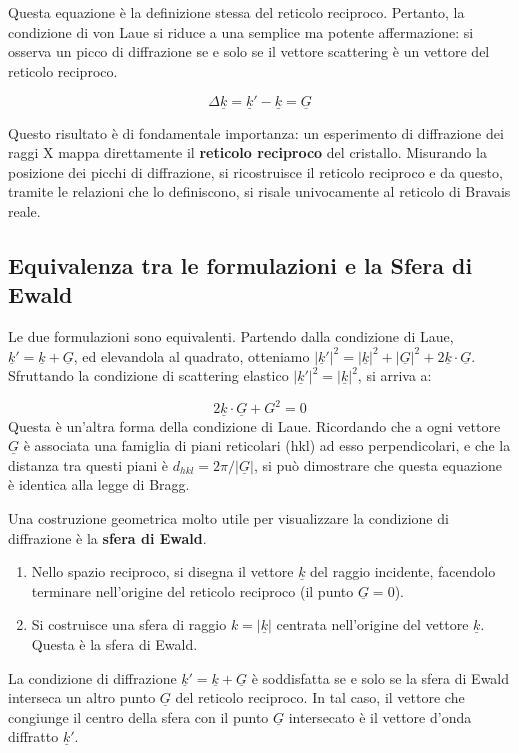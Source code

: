 Questa equazione è la definizione stessa del reticolo reciproco. Pertanto, la condizione di von Laue si riduce a una semplice ma potente affermazione: si osserva un picco di diffrazione se e solo se il vettore scattering è un vettore del reticolo reciproco.

\begin{equation}
    \Delta\underline{k} = \underline{k}' - \underline{k} = \underline{G}
\end{equation}

Questo risultato è di fondamentale importanza: un esperimento di diffrazione dei raggi X mappa direttamente il \textbf{reticolo reciproco} del cristallo. Misurando la posizione dei picchi di diffrazione, si ricostruisce il reticolo reciproco e da questo, tramite le relazioni che lo definiscono, si risale univocamente al reticolo di Bravais reale.

\subsection{Equivalenza tra le formulazioni e la Sfera di Ewald}
Le due formulazioni sono equivalenti. Partendo dalla condizione di Laue, $\underline{k}' = \underline{k} + \underline{G}$, ed elevandola al quadrato, otteniamo $|\underline{k}'|^2 = |\underline{k}|^2 + |\underline{G}|^2 + 2\underline{k} \cdot \underline{G}$. Sfruttando la condizione di scattering elastico $|\underline{k}'|^2 = |\underline{k}|^2$, si arriva a:

\begin{equation}
    2\underline{k} \cdot \underline{G} + G^2 = 0
\end{equation}
Questa è un'altra forma della condizione di Laue. Ricordando che a ogni vettore $\underline{G}$ è associata una famiglia di piani reticolari (hkl) ad esso perpendicolari, e che la distanza tra questi piani è $d_{hkl} = 2\pi/|\underline{G}|$, si può dimostrare che questa equazione è identica alla legge di Bragg.

Una costruzione geometrica molto utile per visualizzare la condizione di diffrazione è la \textbf{sfera di Ewald}.
\begin{enumerate}
    \item Nello spazio reciproco, si disegna il vettore $\underline{k}$ del raggio incidente, facendolo terminare nell'origine del reticolo reciproco (il punto $\underline{G}=0$).
    \item Si costruisce una sfera di raggio $k = |\underline{k}|$ centrata nell'origine del vettore $\underline{k}$. Questa è la sfera di Ewald.
\end{enumerate}
La condizione di diffrazione $\underline{k}' = \underline{k} + \underline{G}$ è soddisfatta se e solo se la sfera di Ewald interseca un altro punto $\underline{G}$ del reticolo reciproco. In tal caso, il vettore che congiunge il centro della sfera con il punto $\underline{G}$ intersecato è il vettore d'onda diffratto $\underline{k}'$.

